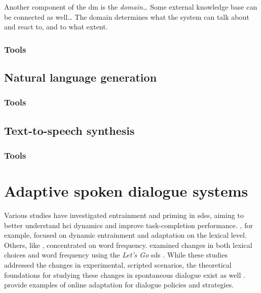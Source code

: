 Another component of the \ac{dm} is the \emph{domain}\ldots
Some external knowledge base can be connected as well\ldots
The domain determines what the system can talk about and react to, and to what extent.
\subsubsection{Tools}
\label{subsubsec:tools_dm}

\subsection{Natural language generation}
\label{subsec:natural_language_generation}

\subsubsection{Tools}
\label{subsubsec:tools_nlg}

\subsection{Text-to-speech synthesis}
\label{subsec:text-to-speech_synthesis}

\subsubsection{Tools}
\label{subsubsec:tools_tts}

\section{Adaptive spoken dialogue systems}
\label{sec:adaptive_spoken_dialogue_systems}


Various studies have investigated entrainment and priming in \acp{sds}, aiming to better understand \ac{hci} dynamics and improve task-completion performance.
\citet{Lopes2013automated, Lopes2011primes}, for example, focused on dynamic entrainment and adaptation on the lexical level.
Others, like \citet{Nenkova2008high}, concentrated on word frequency.
\citet{Parent2010lexical} examined changes in both lexical choices and word frequency using the \emph{Let's Go} \ac{sds} \citep{Raux2005letsgo}.
While these studies addressed the changes in experimental, scripted scenarios, the theoretical foundations for studying these changes in spontaneous dialogue exist as well \citep{Brennan1996lexical}.
\citet{Gasic2013policy, Levin2000stochastic} provide examples of online adaptation for dialogue policies and strategies.

